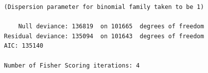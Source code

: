\documentclass[
  article,
  12pt,
  oneside,
  a4paper,
  section=TITLE,
  english,
  brazil
]{abntex2}\usepackage[]{graphicx}\usepackage[]{xcolor}
\makeatletter
\newenvironment{kframe}{%
 \def\at@end@of@kframe{}%
 \ifinner\ifhmode%
  \def\at@end@of@kframe{\end{minipage}}%
  \begin{minipage}{\columnwidth}%
 \fi\fi%
 \def\FrameCommand##1{\hskip\@totalleftmargin \hskip-\fboxsep
 \colorbox{shadecolor}{##1}\hskip-\fboxsep
     \hskip-\linewidth \hskip-\@totalleftmargin \hskip\columnwidth}%
 \MakeFramed {\advance\hsize-\width
   \@totalleftmargin\z@ \linewidth\hsize
   \@setminipage}}%
 {\par\unskip\endMakeFramed%
 \at@end@of@kframe}
\newenvironment{knitrout}{}{} %
\makeatother
\begin{document}
\begin{SingleSpace}
\begin{flushleft}
\begin{knitrout}
\begin{kframe}
\begin{verbatim}
(Dispersion parameter for binomial family taken to be 1)

    Null deviance: 136819  on 101665  degrees of freedom
Residual deviance: 135094  on 101643  degrees of freedom
AIC: 135140

Number of Fisher Scoring iterations: 4
\end{verbatim}
\end{kframe}
\end{knitrout}
\end{flushleft}
\end{SingleSpace}
\end{document}
